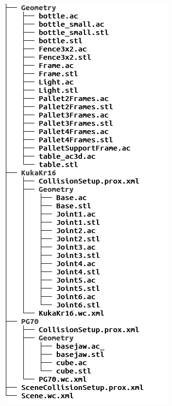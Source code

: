 \documentclass{beamer}
\begin{document}
\begin{frame}
\begin{columns}
\begin{column}{0.25\textwidth}
\begin{centering}
        \includegraphics[height=0.75\textheight]{./graphics/workcell_structure}
      \end{centering}
    \end{column}
  \end{columns}
\end{frame}

\end{document}
